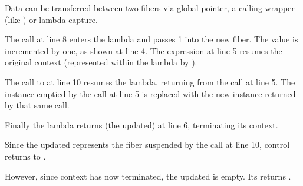 
Data can be transferred between two fibers via global pointer, a calling
wrapper (like ) or lambda capture.

\seeappaassert

The \resume call at line 8 enters the lambda and passes 1 into the
new fiber. The value is incremented by one, as shown at line 4. The expression
 at line 5 resumes the original context (represented
within the lambda by ).

The call to  at line 10 resumes the lambda, returning from
the  call at line 5. The \fiber instance 
emptied by the \resume call at line 5 is replaced with the new instance
returned by that same \resume call.

Finally the lambda returns (the updated)  at line 6, terminating its
context.

Since the updated  represents the fiber suspended by the call at
line 10, control returns to \main.

However, since context  has now terminated, the updated 
is empty. Its \opbool returns .

